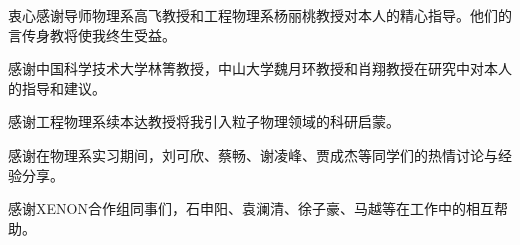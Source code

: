 
\begin{acknowledgements}
  衷心感谢导师物理系高飞教授和工程物理系杨丽桃教授对本人的精心指导。他们的言传身教将使我终生受益。

  感谢中国科学技术大学林箐教授，中山大学魏月环教授和肖翔教授在研究中对本人的指导和建议。

  感谢工程物理系续本达教授将我引入粒子物理领域的科研启蒙。

  感谢在物理系实习期间，刘可欣、蔡畅、谢凌峰、贾成杰等同学们的热情讨论与经验分享。

  感谢XENON合作组同事们，石申阳、袁澜清、徐子豪、马越等在工作中的相互帮助。
\end{acknowledgements}
